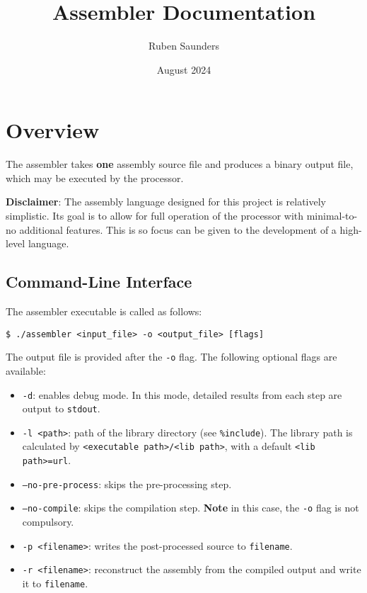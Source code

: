 \documentclass[10pt]{article}
\title{Assembler Documentation}
\author{Ruben Saunders}
\date{August 2024}
\begin{document}
\maketitle
\tableofcontents

\newpage

\section{Overview}

The assembler takes \textbf{one} assembly source file and produces a binary output file, which may be executed by the processor.

\textbf{Disclaimer}: The assembly language designed for this project is relatively simplistic.
Its goal is to allow for full operation of the processor with minimal-to-no additional features.
This is so focus can be given to the development of a high-level language.

\subsection{Command-Line Interface}

The assembler executable is called as follows:

\medskip
\begin{lstlisting}[style=bashconsole]
$ ./assembler <input_file> -o <output_file> [flags]
\end{lstlisting}

The output file is provided after the \texttt{-o} flag.
The following optional flags are available:
\begin{itemize}
    \item \texttt{-d}: enables debug mode.
    In this mode, detailed results from each step are output to \texttt{stdout}.
    \item \texttt{-l <path>}: path of the library directory (see \texttt{\%include}).
    The library path is calculated by \texttt{<executable path>/<lib path>}, with a default \texttt{<lib path>=url}.
    \item \texttt{--no-pre-process}: skips the pre-processing step.
    \item \texttt{--no-compile}: skips the compilation step.
    \textbf{Note} in this case, the \texttt{-o} flag is not compulsory.
    \item \texttt{-p <filename>}: writes the post-processed source to \texttt{filename}.
    \item \texttt{-r <filename>}: reconstruct the assembly from the compiled output and write it to \texttt{filename}.
\end{itemize}
\end{document}
